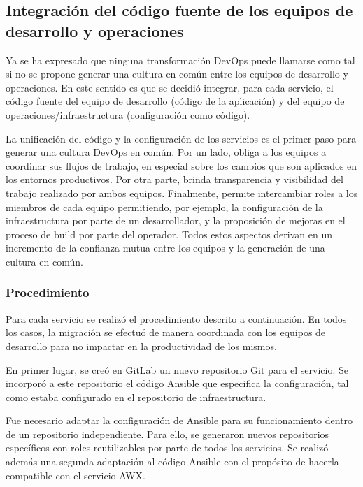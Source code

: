 \subsection{Integración del código fuente de los equipos de desarrollo y operaciones}

Ya se ha expresado que ninguna transformación DevOps puede llamarse como tal si no se propone generar una cultura en común entre los equipos de desarrollo y operaciones. En este sentido es que se decidió integrar, para cada servicio, el código fuente del equipo de desarrollo (código de la aplicación) y del equipo de operaciones/infraestructura (configuración como código).

La unificación del código y la configuración de los servicios es el primer paso para generar una cultura DevOps en común. Por un lado, obliga a los equipos a coordinar sus flujos de trabajo, en especial sobre los cambios que son aplicados en los entornos productivos. Por otra parte, brinda transparencia y visibilidad del trabajo realizado por ambos equipos. Finalmente, permite intercambiar roles a los miembros de cada equipo permitiendo, por ejemplo, la configuración de la infraestructura por parte de un desarrollador, y la proposición de mejoras en el proceso de build por parte del operador. Todos estos aspectos derivan en un incremento de la confianza mutua entre los equipos y la generación de una cultura en común.

\subsubsection{Procedimiento}

Para cada servicio se realizó el procedimiento descrito a continuación. En todos los casos, la migración se efectuó de manera coordinada con los equipos de desarrollo para no impactar en la productividad de los mismos.

En primer lugar, se creó en GitLab un nuevo repositorio Git para el servicio. Se incorporó a este repositorio el código Ansible que especifica la configuración, tal como estaba configurado en el repositorio de infraestructura.

Fue necesario adaptar la configuración de Ansible para su funcionamiento dentro de un repositorio independiente. Para ello, se generaron nuevos repositorios específicos con roles reutilizables por parte de todos los servicios. Se realizó además una segunda adaptación al código Ansible con el propósito de hacerla compatible con el servicio AWX.

